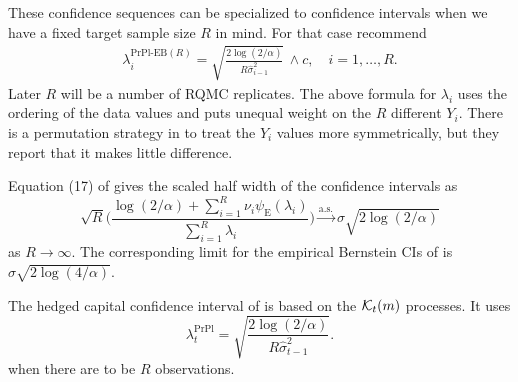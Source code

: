 \documentclass{article}
\newcommand{\art}[1]{\begingroup\color{blue}#1\endgroup}
\newcommand{\toas}{\stackrel{\mathrm{a.s.}}{\to}}
\newcommand{\prpl}{\text{PrPl}}
\newcommand{\prpleb}{\text{PrPl-EB}}
\newcommand{\eb}{\mathrm{E}}
\begin{document}
These confidence sequences can be specialized to confidence
intervals when we have a fixed target sample size $R$
in mind.  For that case \cite{WauRam24a}
recommend
\begin{align}\label{eq:purplelambda}
\lambda_i^{\prpleb(R)} = \sqrt{\frac{2\log(2/\alpha)}{R\hat\sigma^2_{i-1}}}\,\wedge c,\quad i=1,\dots,R.
\end{align}
Later $R$ will be a number of RQMC replicates.
The above formula for $\lambda_i$ uses the ordering
of the data values and puts unequal weight on the
$R$ different $Y_i$. There is a permutation strategy
in \cite{WauRam24a} to treat the $Y_i$ values more
symmetrically, but they report that it makes little difference.

Equation (17) of \cite{WauRam24a} gives the
scaled half width of the \prpleb{} confidence intervals as
$$
\sqrt{R}\biggl(\frac{\log(2/\alpha)+\sum_{i=1}^R\nu_i\psi_\eb(\lambda_i)}{\sum_{i=1}^R\lambda_i} \biggr)\toas \sigma\sqrt{2\log(2/\alpha)}
$$
as $R\to\infty$.  The corresponding limit for the empirical
Bernstein CIs of \cite{maurer2009empirical}
is $\sigma\sqrt{2\log(4/\alpha)}$.

\art{The hedged capital confidence interval of \cite{WauRam24a}
is based on the $\mathcal{K}_t(m)$ processes.  It uses
$$
\lambda_t^\prpl = \sqrt{\frac{2\log(2/\alpha)}{R\hat \sigma^2_{t-1}}}.
$$
when there are to be $R$  observations. 
}
\end{document}
